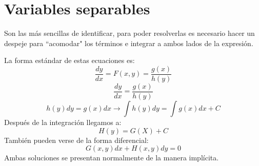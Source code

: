 \documentclass[
	11pt, %
	fleqn, %
	a4paper, %
]{LegrandOrangeBook}
\begin{document}
\section{Variables separables}
Son las más sencillas de identificar, para poder resolverlas es necesario hacer un despeje para ``acomodar" los términos e integrar a ambos lados de la expresión.
\begin{definition}
La forma estándar de estas ecuaciones es:\\
\begin{displaymath}
\frac{dy}{dx}=F(x,y)=\frac{g(x)}{h(y)}
\end{displaymath}
\begin{displaymath}
\frac{dy}{dx}=\frac{g(x)}{h(y)}
\end{displaymath}
\begin{displaymath}
h(y)dy=g(x)dx \rightarrow \int h(y)dy=\int g(x)dx + C
\end{displaymath}
Después de la integración llegamos a:
\begin{displaymath}
H(y)=G(X)+C
\end{displaymath}
También pueden verse de la forma diferencial:\\
\begin{equation}\label{eq:edprimerorden}
G(x,y)dx+H(x,y)dy=0
\end{equation}
Ambas soluciones se presentan normalmente de la manera implícita.
\end{definition}
\end{document}
